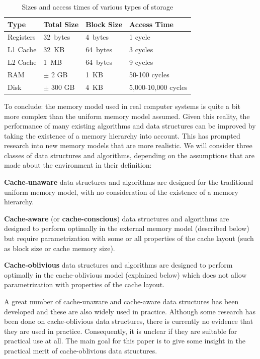 \documentclass{acm_proc_article-sp}
\begin{document}
\begin{table}
\begin{center}
\begin{tabular}{ l l l l }
\hline
\textbf{Type} & \textbf{Total Size} & \textbf{Block Size} & \textbf{Access Time} \\
\hline
Registers  &   32~bytes & 4~bytes & 1 cycle \\
L1 Cache   &   32~KB    & 64~bytes & 3 cycles \\
L2 Cache   &    1~MB    & 64~bytes & 9 cycles \\
RAM        &  $\pm$ 2 GB    & 1~KB     & 50-100 cycles \\
Disk       &  $\pm$ 300 GB    & 4~KB     & 5,000-10,000 cycles \\
\hline
\end{tabular}
\caption{Sizes and access times of various types of storage}
\label{tab-memhier}
\end{center}
\end{table}

To conclude: the memory model used in real computer systems is quite a bit more complex than the uniform memory model assumed. Given this reality, the performance of many existing algorithms and data structures can be improved by taking the existence of a memory hierarchy into account. This has prompted research into new memory models that are more realistic. We will consider three classes of data structures and algorithms, depending on the assumptions that are made about the environment in their definition:
\begin{list}{}{}
\item \textbf{Cache-unaware} data structures and algorithms are designed for
the traditional uniform memory model, with no consideration of the existence
of a memory hierarchy.
\item \textbf{Cache-aware} (or \textbf{cache-conscious}) data structures and
algorithms are designed to perform optimally in the external memory model
(described below) but require parametrization with some or all properties of
the cache layout (such as block size or cache memory size).
\item \textbf{Cache-oblivious} data structures and algorithms are designed to
perform optimally in the cache-oblivious model (explained below) which does
not allow para\-metri\-zation with properties of the cache layout.
\end{list}

A great number of cache-unaware and cache-aware data structures has been developed and these are also widely used in practice.
Although some research has been done on cache-oblivious data structures, there is currently no evidence that they are used in practice. Consequently, it is unclear if they are suitable for practical use at all. The main goal for this paper is to give some insight in the practical merit of cache-oblivious data structures.
\end{document}
